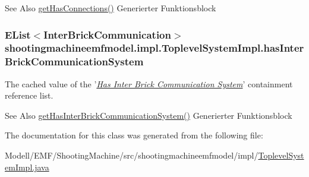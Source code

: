 \begin{DoxySeeAlso}{See Also}
\hyperlink{classshootingmachineemfmodel_1_1impl_1_1_toplevel_system_impl_a6eb5ebd679d93fa77dbcbe3118defadc}{get\-Has\-Connections()} Generierter Funktionsblock  
\end{DoxySeeAlso}
\hypertarget{classshootingmachineemfmodel_1_1impl_1_1_toplevel_system_impl_aa42422d9f63e92d2fbd9a5e792d5ab1d}{
\subsubsection[{has\-Inter\-Brick\-Communication\-System}]{\setlength{\rightskip}{0pt plus 5cm}E\-List$<${\bf Inter\-Brick\-Communication}$>$ shootingmachineemfmodel.\-impl.\-Toplevel\-System\-Impl.\-has\-Inter\-Brick\-Communication\-System\hspace{0.3cm}{\ttfamily [protected]}}}\label{classshootingmachineemfmodel_1_1impl_1_1_toplevel_system_impl_aa42422d9f63e92d2fbd9a5e792d5ab1d}
The cached value of the '\hyperlink{classshootingmachineemfmodel_1_1impl_1_1_toplevel_system_impl_aa988e6aa9d9405ebfba8d30a9e1c7689}{{\itshape Has Inter Brick Communication System}}' containment reference list.

\begin{DoxySeeAlso}{See Also}
\hyperlink{classshootingmachineemfmodel_1_1impl_1_1_toplevel_system_impl_aa988e6aa9d9405ebfba8d30a9e1c7689}{get\-Has\-Inter\-Brick\-Communication\-System()} Generierter Funktionsblock  
\end{DoxySeeAlso}


The documentation for this class was generated from the following file\-:\begin{DoxyCompactItemize}
\item 
Modell/\-E\-M\-F/\-Shooting\-Machine/src/shootingmachineemfmodel/impl/\hyperlink{_toplevel_system_impl_8java}{Toplevel\-System\-Impl.\-java}\end{DoxyCompactItemize}
